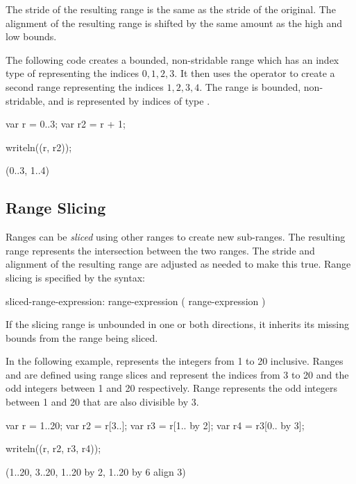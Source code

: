 The stride of the resulting range is the same as the stride of the
original. The alignment of the resulting range is shifted by the same amount as
the high and low bounds.

\begin{example}
The following code creates a bounded, non-stridable range 
which has an index type of  representing the indices ${0,
  1, 2, 3}$.  It then uses the \chpl{+} operator to
create a second range  representing the indices ${1, 2, 3,
  4}$.  The  range is bounded, non-stridable, and is represented by
indices of type .
\begin{chapelpre}
\end{chapelpre}
\begin{chapel}
var r = 0..3;
var r2 = r + 1;
\end{chapel}
\begin{chapelpost}
writeln((r, r2));
\end{chapelpost}
\begin{chapeloutput}
(0..3, 1..4)
\end{chapeloutput}
\end{example}


\subsection{Range Slicing}
\label{Range_Slicing}

Ranges can be \emph{sliced} using other ranges to create new
sub-ranges.  The resulting range represents the intersection between
the two ranges.  The stride and alignment of the resulting range are adjusted as
needed to make this true.  Range slicing is specified by the syntax:
\begin{syntax}
sliced-range-expression:
  range-expression ( range-expression )
\end{syntax}
\noindent If the slicing range is unbounded in one or both directions, it
inherits its missing bounds from the range being sliced.

\begin{example}
In the following example,  represents the integers from 1 to
20 inclusive.  Ranges  and  are defined using range
slices and represent the indices from 3 to 20 and the odd integers
between 1 and 20 respectively. Range  represents the odd
integers between 1 and 20 that are also divisible by 3.
\begin{chapelpre}
\end{chapelpre}
\begin{chapel}
var r = 1..20;
var r2 = r[3..];
var r3 = r[1.. by 2];
var r4 = r3[0.. by 3];
\end{chapel}
\begin{chapelpost}
writeln((r, r2, r3, r4));
\end{chapelpost}
\begin{chapeloutput}
(1..20, 3..20, 1..20 by 2, 1..20 by 6 align 3)
\end{chapeloutput}
\end{example}

